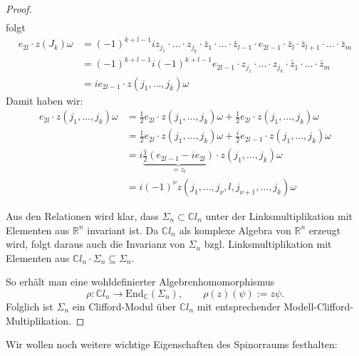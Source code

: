 \documentclass[10pt, letterpaper]{article}
\newcommand{\R}{\mathbb{R}}
\newcommand{\C}{\mathbb{C}}
\newcommand{\End}{\mathrm{End}}
\begin{document}
\begin{proof}
$$\begin{aligned}
    \end{aligned}
    $$
    folgt
    $$
    \begin{aligned}
    e_{2 l} \cdot z\left(J_k\right)\omega & =(-1)^{k+l-1} i z_{j_1} \cdot \ldots \cdot z_{j_k} \cdot \bar{z}_1 \cdot \ldots \cdot \bar{z}_{l-1} \cdot e_{2 l-1} \cdot \bar{z}_l \cdot \bar{z}_{l+1} \cdot \ldots \cdot \bar{z}_m \\
    & =(-1)^{k+l-1} i(-1)^{k+l-1} e_{2 l-1} \cdot z_{j_1} \cdot \ldots \cdot z_{j_k} \cdot \bar{z}_1 \cdot \ldots \cdot \bar{z}_m \\
    & =i e_{2 l-1} \cdot z\left(j_1, \ldots, j_k\right)\omega
    \end{aligned}
    $$
    Damit haben wir:
    $$
    \begin{aligned}
    e_{2 l} \cdot z\left(j_1, \ldots, j_k\right)\omega & =\frac{1}{2} e_{2 l} \cdot z\left(j_1, \ldots, j_k\right)\omega+\frac{1}{2} e_{2 l} \cdot z\left(j_1, \ldots, j_k\right)\omega \\
    & = \frac{1}{2} e_{2 l} \cdot z\left(j_1, \ldots, j_k\right)\omega+\frac{i}{2} e_{2 l-1} \cdot z\left(j_1, \ldots, j_k\right)\omega \\
    & =i \underbrace{\frac{1}{2}\left(e_{2 l-1}-i e_{2 l}\right)}_{=z_l} \cdot z\left(j_1, \ldots, j_k\right)\omega \\
    & =i(-1)^\nu z\left(j_1, \ldots, j_\nu, l, j_{\nu+1}, \ldots, j_k\right)\omega
    \end{aligned}
    $$


    Aus den Relationen wird klar, dass $\Sigma_n\subset \C l_n$ unter der Linksmultiplikation mit Elementen aus $\R^n$ invariant ist. Da $\C l_n$ als komplexe Algebra von $\R^n$
    erzeugt wird, folgt daraus auch die Invarianz von $\Sigma_n$ bzgl. Linksmultiplikation mit Elementen aus $\C l_n\cdot \Sigma_n\subseteq \Sigma_n$.

    So erhält man eine wohldefinierter Algebrenhomomorphismus
    \[
    \rho:\C l_n\longrightarrow \End_{\C}(\Sigma_n),
    \qquad
    \rho(z)(\psi):=z\psi.
    \]
    Folglich ist $\Sigma_n$ ein Clifford-Modul über $\C l_n$ mit entsprechender Modell-Clifford-Multiplikation.
\end{proof}



\bigskip 

Wir wollen noch weitere wichtige Eigenschaften des Spinorraums festhalten:
\end{document}
